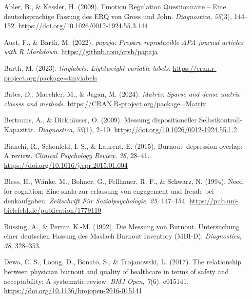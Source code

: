 \documentclass[
  man]{apa6}
\newlength{\cslhangindent}
\newenvironment{CSLReferences}[2] %
 {\begin{list}{}{%
  \setlength{\itemindent}{0pt}
  \setlength{\leftmargin}{0pt}
  \setlength{\parsep}{0pt}
  \ifodd #1
   \setlength{\leftmargin}{\cslhangindent}
   \setlength{\itemindent}{-1\cslhangindent}
  \fi
  \setlength{\itemsep}{#2\baselineskip}}}
 {\end{list}}
\begin{document}
\label{refs}
\begin{CSLReferences}{1}{0}
Abler, B., \& Kessler, H. (2009). {Emotion Regulation Questionnaire -- Eine deutschsprachige Fassung des ERQ von Gross und John}. \emph{Diagnostica}, \emph{55}(3), 144--152. \url{https://doi.org/10.1026/0012-1924.55.3.144}

Aust, F., \& Barth, M. (2022). \emph{{papaja}: {Prepare} reproducible {APA} journal articles with {R Markdown}}. \url{https://github.com/crsh/papaja}

Barth, M. (2023). \emph{{tinylabels}: Lightweight variable labels}. \url{https://cran.r-project.org/package=tinylabels}

Bates, D., Maechler, M., \& Jagan, M. (2024). \emph{Matrix: Sparse and dense matrix classes and methods}. \url{https://CRAN.R-project.org/package=Matrix}

Bertrams, A., \& Dickhäuser, O. (2009). {Messung dispositioneller Selbstkontroll-Kapazität}. \emph{Diagnostica}, \emph{55}(1), 2--10. \url{https://doi.org/10.1026/0012-1924.55.1.2}

Bianchi, R., Schonfeld, I. S., \& Laurent, E. (2015). Burnout--depression overlap: A review. \emph{Clinical Psychology Review}, \emph{36}, 28--41. \url{https://doi.org/10.1016/j.cpr.2015.01.004}

Bless, H., Wänke, M., Bohner, G., Fellhauer, R. F., \& Schwarz, N. (1994). Need for cognition: Eine skala zur erfassung von engagement und freude bei denkaufgaben. \emph{Zeitschrift Für Sozialpsychologie}, \emph{25}, 147--154. \url{https://pub.uni-bielefeld.de/publication/1779110}

Büssing, A., \& Perrar, K.-M. (1992). Die {Messung von Burnout. Untersuchung einer deutschen Fassung des Maslach Burnout Inventory (MBI-D)}. \emph{Diagnostica}, \emph{38}, 328--353.

Dewa, C. S., Loong, D., Bonato, S., \& Trojanowski, L. (2017). The relationship between physician burnout and quality of healthcare in terms of safety and acceptability: A systematic review. \emph{BMJ Open}, \emph{7}(6), e015141. \url{https://doi.org/10.1136/bmjopen-2016-015141}


\end{CSLReferences}
\end{document}

